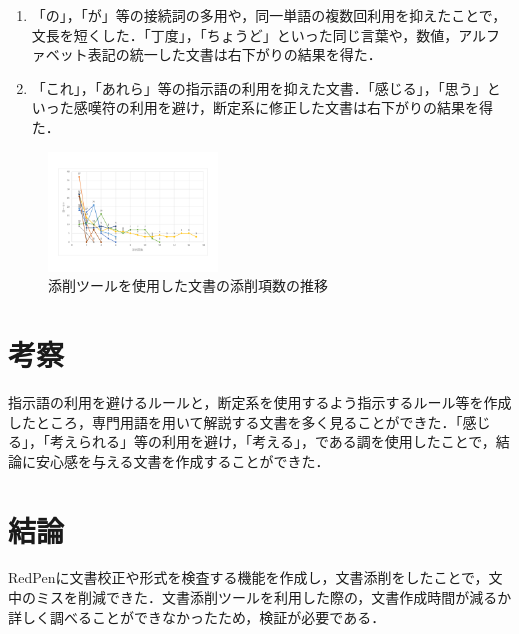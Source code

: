 \documentclass[uplatex,twocolumn,dvipdfmx]{jsarticle}
\begin{document}
\begin{enumerate}
\item 「の」，「が」等の接続詞の多用や，同一単語の複数回利用を抑えたことで，文長を短くした．「丁度」，「ちょうど」といった同じ言葉や，数値，アルファベット表記の統一した文書は右下がりの結果を得た．
\item 「これ」，「あれら」等の指示語の利用を抑えた文書．「感じる」，「思う」といった感嘆符の利用を避け，断定系に修正した文書は右下がりの結果を得た．
\end{enumerate}

\begin{figure}[htb]
\centering
\includegraphics[width=4.5cm,clip]{redpen.pdf}
\caption{添削ツールを使用した文書の添削項数の推移}\label{conf}
\end{figure}

\section{考察}
指示語の利用を避けるルールと，断定系を使用するよう指示するルール等を作成したところ，専門用語を用いて解説する文書を多く見ることができた．「感じる」，「考えられる」等の利用を避け，「考える」，である調を使用したことで，結論に安心感を与える文書を作成することができた．

\section{結論}
RedPenに文書校正や形式を検査する機能を作成し，文書添削をしたことで，文中のミスを削減できた．文書添削ツールを利用した際の，文書作成時間が減るか詳しく調べることができなかったため，検証が必要である．





\end{document}
